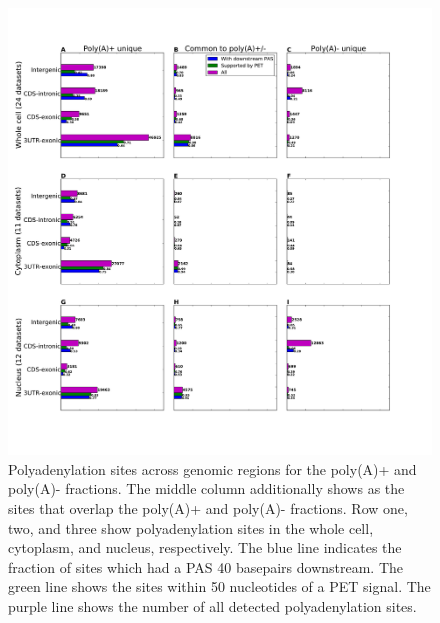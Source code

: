 \begin{figure}[hb]
	\begin{center}
		\includegraphics[scale=0.3]{figures/polyadenylation/intersected_sidebars_pA_2+.pdf}
	\end{center}
	\caption{Polyadenylation sites across genomic regions for the poly(A)+ and poly(A)-
	fractions. The middle column additionally shows as the sites that overlap
	the poly(A)+ and poly(A)- fractions. Row one, two, and three show
	polyadenylation sites in the whole cell, cytoplasm, and nucleus,
	respectively. The blue line indicates the fraction of sites which had a PAS
	40 basepairs downstream. The green line shows the sites within 50
	nucleotides of a PET signal. The purple line shows the number of all
	detected polyadenylation sites.} \label{fig:sidebars_intersect}
\end{figure}


